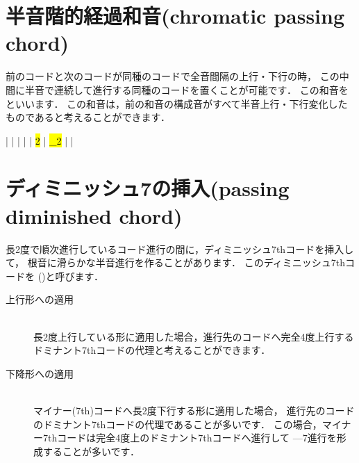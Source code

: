 \documentclass[dvipdfmx,uplatex,b5paper,openany,jbase=12Q,nomag*,textwidth-limit=44%
               ]{gachimuchi}[2020/05/05]
\begin{document}
\section{半音階的経過和音(chromatic passing chord)}
前のコードと次のコードが同種のコードで全音間隔の上行・下行の時，
この中間に半音で連続して進行する同種のコードを置くことが可能です．
この和音をといいます．
この和音は，前の和音の構成音がすべて半音上行・下行変化したものであると考えることができます．

\begin{Music}
  \generalmeter{\meterC}%
  \Startpiece
  \NOTes%
  |%
  \en%
  \NOTes%
  |%
  \en\bar%
  \NOTEs%
  |%
  \en\doublebar%
  \NOTes%
  |%
  \hl{2}%
  \en%
  \NOTes%
  |%
  \hl{_2}%
  \en\bar%
  \NOTEs%
  |%
  \en\setdoublebar%
  \endpiece%
\end{Music}

\section{ディミニッシュ7の挿入(passing diminished chord)}
長2度で順次進行しているコード進行の間に，ディミニッシュ7thコードを挿入して，
根音に滑らかな半音進行を作ることがあります．
このディミニッシュ7thコードを
\jghost()と呼びます．
\begin{description}
  \item[上行形への適用] ~\\
  長2度上行している形に適用した場合，進行先のコードへ完全4度上行する
  ドミナント7thコードの代理と考えることができます．
  \item[下降形への適用] ~\\
  マイナー(7th)コードへ長2度下行する形に適用した場合，
  進行先のコードのドミナント7thコードの代理であることが多いです．
  この場合，マイナー7thコードは完全4度上のドミナント7thコードへ進行して
  \Gnii\Min{}---\Gnv\subsc7進行を形成することが多いです．
\end{description}
\end{document}
